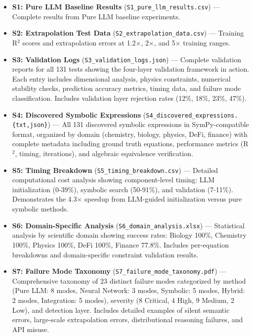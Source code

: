 \documentclass[twoside,11pt]{article}
\begin{document}
\begin{itemize}
\item \textbf{S1: Pure LLM Baseline Results} (\texttt{S1\_pure\_llm\_results.csv}) --- Complete results from Pure LLM baseline experiments.

\item \textbf{S2: Extrapolation Test Data} (\texttt{S2\_extra\-polation\_data.csv}) --- Training R$^2$ scores and extrapolation errors at 1.2$\times$, 2$\times$, and 5$\times$ training ranges.

\item \textbf{S3: Validation Logs} (\texttt{S3\_validation\_logs.json}) --- Complete validation reports for all 131 tests showing the four-layer validation framework in action. Each entry includes dimensional analysis, physics constraints, numerical stability checks, prediction accuracy metrics, timing data, and failure mode classification. Includes validation layer rejection rates (12\%, 18\%, 23\%, 47\%).

\item \textbf{S4: Discovered Symbolic Expressions} (\texttt{S4\_discovered\_expressions.\{txt,json\}}) --- All 131 discovered symbolic expressions in SymPy-compatible format, organized by domain (chemistry, biology, physics, DeFi, finance) with complete metadata including ground truth equations, performance metrics (R$^2$, timing, iterations), and algebraic equivalence verification.

\item \textbf{S5: Timing Breakdown} (\texttt{S5\_timing\_breakdown.csv}) --- Detailed computational cost analysis showing component-level timing: LLM initialization (0-39\%), symbolic search (50-91\%), and validation (7-11\%). Demonstrates the 4.3× speedup from LLM-guided initialization versus pure symbolic methods.

\item \textbf{S6: Domain-Specific Analysis} (\texttt{S6\_domain\_analysis.xlsx}) --- Statistical analysis by scientific domain showing success rates: Biology 100\%, Chemistry 100\%, Physics 100\%, DeFi 100\%, Finance 77.8\%. Includes per-equation breakdowns and domain-specific constraint validation results.

\item \textbf{S7: Failure Mode Taxonomy} (\texttt{S7\_failure\_mode\_taxonomy.pdf}) --- Comprehensive taxonomy of 23 distinct failure modes categorized by method (Pure LLM: 8 modes, Neural Network: 3 modes, Symbolic: 5 modes, Hybrid: 2 modes, Integration: 5 modes), severity (8 Critical, 4 High, 9 Medium, 2 Low), and detection layer. Includes detailed examples of silent semantic errors, large-scale extrapolation errors, distributional reasoning failures, and API misuse.


\end{itemize}
\end{document}
